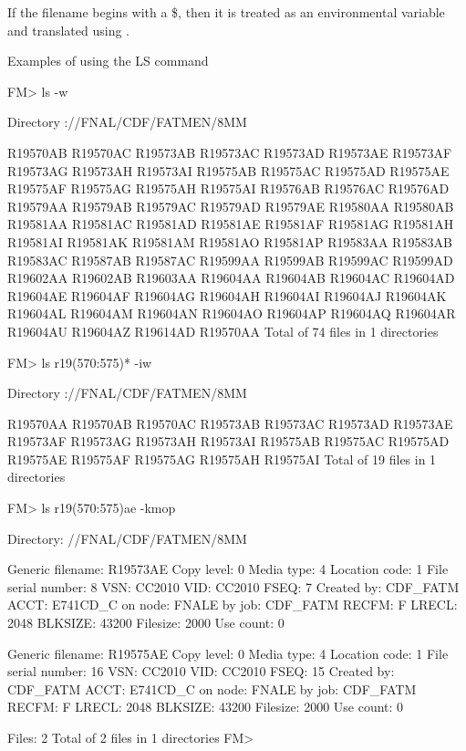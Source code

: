 If the filename begins with a \$, then it is treated as an environmental
variable and translated using .

\begin{XMPt}{Examples of using the LS command}

FM> ls -w

Directory ://FNAL/CDF/FATMEN/8MM

R19570AB R19570AC R19573AB R19573AC R19573AD R19573AE R19573AF R19573AG 
R19573AH R19573AI R19575AB R19575AC R19575AD R19575AE R19575AF R19575AG 
R19575AH R19575AI R19576AB R19576AC R19576AD R19579AA R19579AB R19579AC 
R19579AD R19579AE R19580AA R19580AB R19581AA R19581AC R19581AD R19581AE 
R19581AF R19581AG R19581AH R19581AI R19581AK R19581AM R19581AO R19581AP 
R19583AA R19583AB R19583AC R19587AB R19587AC R19599AA R19599AB R19599AC 
R19599AD R19602AA R19602AB R19603AA R19604AA R19604AB R19604AC R19604AD 
R19604AE R19604AF R19604AG R19604AH R19604AI R19604AJ R19604AK R19604AL 
R19604AM R19604AN R19604AO R19604AP R19604AQ R19604AR R19604AU R19604AZ 
R19614AD R19570AA 
Total of     74 files in      1 directories

FM> ls r19(570:575)* -iw 

Directory ://FNAL/CDF/FATMEN/8MM

R19570AA R19570AB R19570AC R19573AB R19573AC R19573AD R19573AE R19573AF 
R19573AG R19573AH R19573AI R19575AB R19575AC R19575AD R19575AE R19575AF 
R19575AG R19575AH R19575AI 
Total of     19 files in      1 directories

FM> ls r19(570:575)ae -kmop

Directory: //FNAL/CDF/FATMEN/8MM


Generic filename: R19573AE
Copy level:  0 Media type: 4 Location code:      1 File serial number:      8
VSN: CC2010 VID: CC2010 FSEQ:    7
Created by:  CDF_FATM ACCT: E741CD_C on node: FNALE    by job: CDF_FATM
RECFM:  F    LRECL:  2048 BLKSIZE: 43200 Filesize:  2000 Use count:     0

Generic filename: R19575AE
Copy level:  0 Media type: 4 Location code:      1 File serial number:     16
VSN: CC2010 VID: CC2010 FSEQ:   15
Created by:  CDF_FATM ACCT: E741CD_C on node: FNALE    by job: CDF_FATM
RECFM:  F    LRECL:  2048 BLKSIZE: 43200 Filesize:  2000 Use count:     0

Files:    2
Total of      2 files in      1 directories
FM> 
 
 

\end{XMPt}
